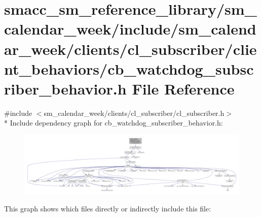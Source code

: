 \hypertarget{sm__calendar__week_2include_2sm__calendar__week_2clients_2cl__subscriber_2client__behaviors_2cb_36e06d0e8a2b4ac94bf461d1b035e759}{}\section{smacc\+\_\+sm\+\_\+reference\+\_\+library/sm\+\_\+calendar\+\_\+week/include/sm\+\_\+calendar\+\_\+week/clients/cl\+\_\+subscriber/client\+\_\+behaviors/cb\+\_\+watchdog\+\_\+subscriber\+\_\+behavior.h File Reference}
\label{sm__calendar__week_2include_2sm__calendar__week_2clients_2cl__subscriber_2client__behaviors_2cb_36e06d0e8a2b4ac94bf461d1b035e759}
{\ttfamily \#include $<$sm\+\_\+calendar\+\_\+week/clients/cl\+\_\+subscriber/cl\+\_\+subscriber.\+h$>$}\\*
Include dependency graph for cb\+\_\+watchdog\+\_\+subscriber\+\_\+behavior.\+h\+:
\nopagebreak
\begin{figure}[H]
\begin{center}
\leavevmode
\includegraphics[width=350pt]{sm__calendar__week_2include_2sm__calendar__week_2clients_2cl__subscriber_2client__behaviors_2cb_1448ff78ed4f375082d09f5f66e7dfd5}
\end{center}
\end{figure}
This graph shows which files directly or indirectly include this file\+:
\nopagebreak
